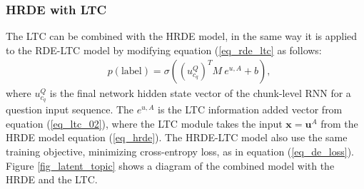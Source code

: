 \documentclass[11pt,a4paper]{article}
\begin{document}
\subsubsection{HRDE with LTC}
The LTC can be combined with the HRDE model, in the same way it is applied to the RDE-LTC model by modifying equation (\ref{eq_rde_ltc} as follows:
\begin{equation}
\begin{aligned}
& p(\text{label}) = \sigma ( ({u_{c_q}^Q})^T M~e^{u,A} + b ),
\end{aligned}
\end{equation}
where $u_{c_q}^Q$  is the final network hidden state vector of the chunk-level RNN for a question input sequence. The $e^{u,A}$ is the LTC information added vector from equation (\ref{eq_ltc_02}), where the LTC module takes the input $\boldsymbol{x}=\boldsymbol{u}^A$ from the HRDE model equation (\ref{eq_hrde}).
The HRDE-LTC model also use  the  same training objective, minimizing cross-entropy loss, as in equation (\ref{eq_de_loss}).
Figure \ref{fig_latent_topic} shows a diagram of the combined model with the HRDE and the LTC.
\end{document}
